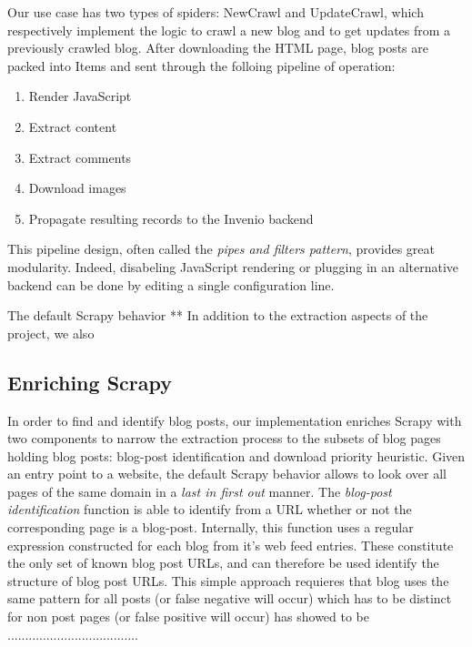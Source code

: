 Our use case has two types of spiders: NewCrawl and UpdateCrawl, which respectively implement the logic to crawl a new blog and to get updates from a previously crawled blog. After downloading the HTML page, blog posts are packed into Items and sent through the folloing pipeline of operation:
\begin{enumerate}[noitemsep]
  \item Render JavaScript
  \item Extract content
  \item Extract comments
  \item Download images
  \item Propagate resulting records to the Invenio backend
\end{enumerate}
This pipeline design, often called the \emph{pipes and filters pattern}\cite[Chapter Messaging Systems]{hohpe2003}, provides great modularity. Indeed, disabeling JavaScript rendering or plugging in an alternative backend can be done by editing a single configuration line.


The default Scrapy behavior
** In addition to the extraction aspects of the project, we also

\subsection{Enriching Scrapy}
In order to find and identify blog posts, our implementation enriches Scrapy with two components to narrow the extraction process to the subsets of blog pages holding blog posts: blog-post identification and download priority heuristic. Given an entry point to a website, the default Scrapy behavior allows to look over all pages of the same domain in a \emph{last in first out} manner. The \emph{blog-post identification} function is able to identify from a URL whether or not the corresponding page is a blog-post. Internally, this function uses a regular expression constructed for each blog from it's web feed entries. These constitute the only set of known blog post URLs, and can therefore be used identify the structure of blog post URLs. This simple approach requieres that blog uses the same pattern for all posts (or false negative will occur) which has to be distinct for non post pages (or false positive will occur) has showed to be .....................................

